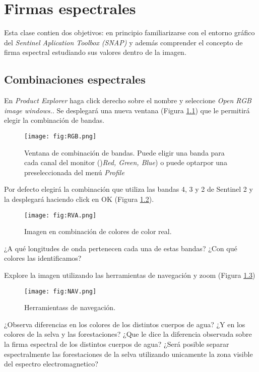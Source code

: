 \chapter{Firmas espectrales}
Esta clase contien dos objetivos: en principio familiarizarse con el entorno gráfico del \emph{Sentinel Aplication Toolbox (SNAP)} y además comprender el concepto de firma espectral estudiando sus valores dentro de la imagen.

\section{Combinaciones espectrales}

En \emph{Product Explorer} haga click derecho sobre el nombre y seleccione \emph{Open RGB image windows.}. Se desplegará una nueva ventana (Figura \ref{fig:RGB}) que le permitirá elegir la combinación de bandas.

\begin{figure}[h!]
    \centering
    \texttt{[image: fig:RGB.png]}
    \caption{Ventana de combinación de bandas. Puede eligir una banda para cada canal del monitor ()\emph{Red, Green, Blue}) o puede optarpor una preseleccionada del menú \emph{Profile}}
    \label{fig:RGB}
\end{figure}

Por defecto elegirá la combinación que utiliza las bandas 4, 3 y 2 de Sentinel 2 y la desplegará haciendo click en OK (Figura \ref{fig:RVA}).

\begin{figure}[h!]
    \centering
    \texttt{[image: fig:RVA.png]}
    \caption{Imagen en combinación de colores de color real.}
    \label{fig:RVA}
\end{figure}

\begin{que}
    ¿A qué longitudes de onda pertenecen cada una de estas bandas? ¿Con qué colores las identificamos?
\end{que}

Explore la imagen utilizando las herramientas de navegación y zoom (Figura \ref{fig:NAV})

\begin{figure}[h!]
    \centering
    \texttt{[image: fig:NAV.png]}
    \caption{Herramientass de navegación.}
    \label{fig:NAV}
\end{figure}



\begin{que}
    ¿Observa diferencias en los colores de los distintos cuerpos de agua? ¿Y en los colores de la selva y las forestaciones? ¿Que le dice la diferencia observada sobre la firma espectral de los distintos cuerpos de agua? ¿Será posible separar espectralmente las forestaciones de la selva utilizando unicamente la zona visible del espectro electromagnetico?
\end{que}

